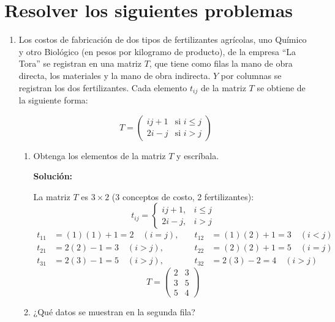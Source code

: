 \documentclass[12pt]{article}
\newcommand{\solucion}{%
    \vspace{0.8em}%
    \textbf{Solución:}%
}
\begin{document}
\section{Resolver los siguientes problemas}

\begin{enumerate}[label=\alph*.-]
    \item Los costos de fabricación de dos tipos de fertilizantes agrícolas, uno Químico y otro Biológico (en pesos por kilogramo de producto), de la empresa ``La Tora'' se registran en una matriz $T$, que tiene como filas la mano de obra directa, los materiales y la mano de obra indirecta. $Y$ por columnas se registran los dos fertilizantes. Cada elemento $t_{ij}$ de la matriz $T$ se obtiene de la siguiente forma:

    \[
    T = \begin{pmatrix} ij + 1 & \text{si } i \leq j \\ 2i - j & \text{si } i > j \end{pmatrix}
    \]

    \begin{enumerate}[label=\roman*)]
        \item Obtenga los elementos de la matriz $T$ y escríbala.

        \solucion

        La matriz $T$ es $3\times2$ (3 conceptos de costo, 2 fertilizantes):
        \[
        t_{ij} = \begin{cases} ij+1, & i \leq j\\[6pt] 2i-j, & i > j \end{cases}
        \]
        \[
        \begin{aligned}
        t_{11}&= (1)(1)+1=2 \quad(i=j), \quad & t_{12}&= (1)(2)+1=3 \quad(i<j)\\
        t_{21}&= 2(2)-1=3   \quad(i>j), \quad & t_{22}&= (2)(2)+1=5 \quad(i=j)\\
        t_{31}&= 2(3)-1=5   \quad(i>j), \quad & t_{32}&= 2(3)-2=4   \quad(i>j)
        \end{aligned}
        \]
        \[
        T = \begin{pmatrix} 2 & 3 \\ 3 & 5 \\ 5 & 4 \end{pmatrix}
        \]

        \item ¿Qué datos se muestran en la segunda fila?


\end{enumerate}
\end{enumerate}
\end{document}
